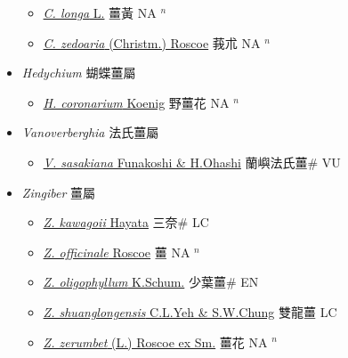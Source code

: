 \begin{itemize}
  \begin{itemize}
        \item[] \href{http://www.theplantlist.org/tpl1.1/search?q=Curcuma+longa}{\textit{C. longa} L.}   薑黃 NA $^n$
        \item[] \href{http://www.theplantlist.org/tpl1.1/search?q=Curcuma+zedoaria}{\textit{C. zedoaria} (Christm.) Roscoe}   莪朮 NA $^n$
  \end{itemize}
 \item[] \textit{Hedychium} 蝴蝶薑屬
                    
  \begin{itemize}
        \item[] \href{http://www.theplantlist.org/tpl1.1/search?q=Hedychium+coronarium}{\textit{H. coronarium} Koenig}   野薑花 NA $^n$
  \end{itemize}
 \item[] \textit{Vanoverberghia} 法氏薑屬
                    
  \begin{itemize}
        \item[] \href{http://www.theplantlist.org/tpl1.1/search?q=Vanoverberghia+sasakiana}{\textit{V. sasakiana} Funakoshi \& H.Ohashi}   蘭嶼法氏薑\# VU
  \end{itemize}
 \item[] \textit{Zingiber} 薑屬
                    
  \begin{itemize}
        \item[] \href{http://www.theplantlist.org/tpl1.1/search?q=Zingiber+kawagoii}{\textit{Z. kawagoii} Hayata}   三奈\# LC
        \item[] \href{http://www.theplantlist.org/tpl1.1/search?q=Zingiber+officinale}{\textit{Z. officinale} Roscoe}   薑 NA $^n$
        \item[] \href{http://www.theplantlist.org/tpl1.1/search?q=Zingiber+oligophyllum}{\textit{Z. oligophyllum} K.Schum.}   少葉薑\# EN
        \item[] \href{http://www.theplantlist.org/tpl1.1/search?q=Zingiber+shuanglongensis}{\textit{Z. shuanglongensis} C.L.Yeh \& S.W.Chung}   雙龍薑 LC
        \item[] \href{http://www.theplantlist.org/tpl1.1/search?q=Zingiber+zerumbet}{\textit{Z. zerumbet} (L.) Roscoe ex Sm.}   薑花 NA $^n$
  \end{itemize}
  \end{itemize}
